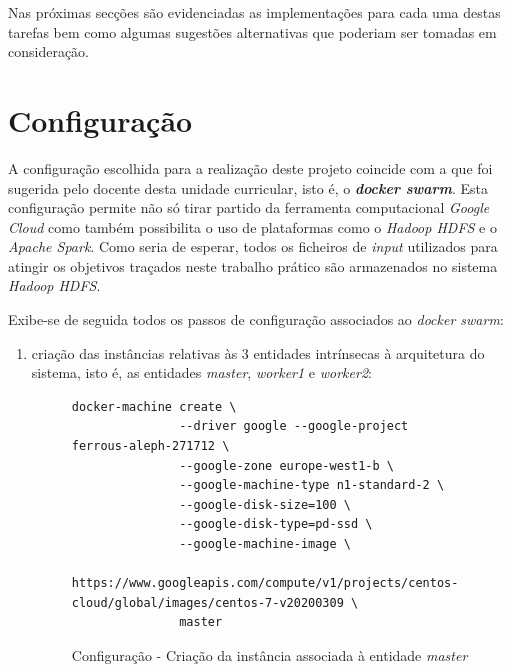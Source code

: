 \documentclass[a4paper]{report}
\begin{document}
{    Nas próximas secções são evidenciadas as implementações para cada uma destas tarefas bem como algumas sugestões alternativas que poderiam ser tomadas em consideração.

    \section{Configuração} \label{sec:Configuration}
        A configuração escolhida para a realização deste projeto coincide com a que foi sugerida pelo docente desta unidade curricular, isto é, o \textbf{\textit{docker swarm}}.
        Esta configuração permite não só tirar partido da ferramenta computacional \textit{Google Cloud} como também possibilita o uso de plataformas como o \textit{Hadoop HDFS} e o \textit{Apache Spark}.
        Como seria de esperar, todos os ficheiros de \textit{input} utilizados para atingir os objetivos traçados neste trabalho prático são armazenados no sistema \textit{Hadoop HDFS}.
        
        Exibe-se de seguida todos os passos de configuração associados ao \textit{docker swarm}:
        \begin{enumerate}[label=\textbf{\arabic*.}]
            \item criação das instâncias relativas às 3 entidades intrínsecas à arquitetura do sistema, isto é, as entidades \textsl{master}, \textsl{worker1} e \textsl{worker2}:
            \begin{figure}[H]
                \centering
                \begin{verbatim}
docker-machine create \
               --driver google --google-project ferrous-aleph-271712 \
               --google-zone europe-west1-b \
               --google-machine-type n1-standard-2 \
               --google-disk-size=100 \
               --google-disk-type=pd-ssd \
               --google-machine-image \
               https://www.googleapis.com/compute/v1/projects/centos-cloud/global/images/centos-7-v20200309 \
               master
                \end{verbatim}
                \caption{Configuração - Criação da instância associada à entidade \textsl{master}}
                \label{fig:1}
            \end{figure}
            

\end{enumerate}}
\end{document}
